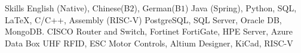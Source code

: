 
\begin{rubric}{Skills}
\entry*[Languages]
    English (Native), Chinese(B$2$), German(B$1$)
    Java (Spring), Python, SQL, \LaTeX, C/C++, Assembly (RISC-V)
\entry*[Databases]
    PostgreSQL, SQL Server, Oracle DB, MongoDB.
\entry*[Networking]
    CISCO Router and Switch, Fortinet FortiGate, HPE Server, Azure Data Box
    UHF RFID, ESC Motor Controls, Altium Designer, KiCad, RISC-V
\end{rubric}
